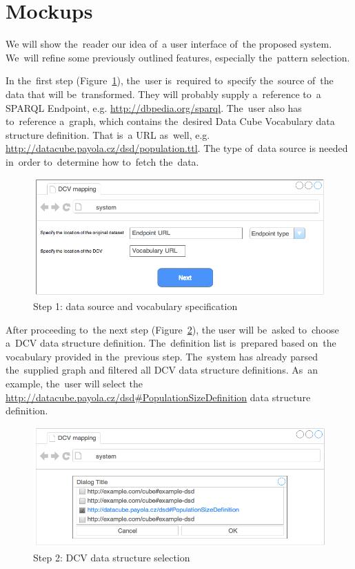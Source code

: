 \section{Mockups}
\FloatBarrier
We will show the~reader our idea of~a user interface of~the proposed system. We~will refine some previously outlined features, especially the~pattern selection.

In the~first step (Figure~\ref{fig:mockup-01}), the~user is~required to~specify the~source of~the data that 
will be~transformed. They will probably supply a~reference to~a SPARQL Endpoint,
e.g. \url{http://dbpedia.org/sparql}. The~user also has to~reference a~graph, which contains the~desired Data Cube Vocabulary data structure definition.
That is~a URL as~well, e.g. \url{http://datacube.payola.cz/dsd/population.ttl}.
The type of~data source 
is needed in~order to~determine how to~fetch the~data.
\begin{figure}
	\centering
	\includegraphics[width=120mm]{img/mockup-01.png}
	\caption{Step 1: data source and vocabulary specification}
	\label{fig:mockup-01}
\end{figure}

After proceeding to~the next step (Figure~\ref{fig:mockup-02}),
the user will be~asked to~choose a~DCV data 
structure definition. The~definition list is~prepared based on~the vocabulary provided 
in the~previous step. The~system has already parsed the~supplied graph and filtered all
DCV data structure definitions. As~an example, the~user will select the
\url{http://datacube.payola.cz/dsd#PopulationSizeDefinition} data structure definition.

\begin{figure}
	\centering
	\includegraphics[width=120mm]{img/mockup-02.png}
	\caption{Step 2: DCV data structure selection}
	\label{fig:mockup-02}
\end{figure}

